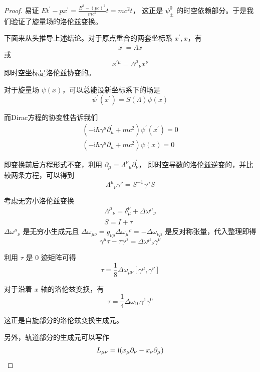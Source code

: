 \begin{proof}
易证 $E t^{\prime}-p x^{\prime}=\frac{E^{2}-(pc)^{2}}{mc^{2}} t=mc^{2} t$，
这正是 $\psi_{\pm}^{0}$ 的时空依赖部分。于是我们验证了旋量场的洛伦兹变换。

下面来从头推导上述结论。对于原点重合的两套坐标系 $x^{\prime}, x$，有
$$x^{\prime}=\Lambda x$$
或
$$x^{\prime \mu}=\Lambda^{\mu}{ }_{\nu} x^{\nu}$$
即时空坐标是洛伦兹协变的。

对于旋量场 $\psi(x)$，可以总能设新坐标系下的场是
$$\psi^{\prime}(x^{\prime})=S(\Lambda) \psi(x)$$

而Dirac方程的协变性告诉我们
$$
\begin{gathered}
\left(-\mathrm{i} \hbar \gamma^{\mu} \partial_{\mu}^{\prime}+m c^{2}\right) \psi^{\prime}(x^{\prime})=0 \\
\left(-\mathrm{i} \hbar \gamma^{\mu} \partial_{\mu}+m c^{2}\right) \psi(x)=0
\end{gathered}
$$

即变换前后方程形式不变，利用 $\partial_{\mu}=\Lambda^{\nu}{ }_{\mu} \partial_{\nu}^{\prime}$，
即时空导数的洛伦兹逆变的，并比较两条方程，可以得到
$$\Lambda^{\mu}{ }_{\nu} \gamma^{\nu}=S^{-1} \gamma^{\mu} S$$

考虑无穷小洛伦兹变换
$$
\begin{gathered}
\Lambda^{\mu}{ }_{\nu}=\delta_{\mu}^{\nu}+\Delta \omega^{\mu}{ }_{\nu} \\
S=I+\tau
\end{gathered}
$$
$\Delta \omega^{\mu}{ }_{\nu}$ 是无穷小生成元且 
$\Delta \omega_{\mu \nu}=g_{\nu \rho} \Delta \omega_{\mu}{ }^{\rho}
=-\Delta \omega_{\nu \mu}$ 是反对称张量，代入整理即得
$$\gamma^{\mu} \tau-\tau \gamma^{\mu}=\Delta \omega^{\mu}{ }_{\nu} \gamma^{\nu}$$

利用 $\tau$ 是 $0$ 迹矩阵可得
$$\tau=\frac{1}{8} \Delta \omega_{\mu \nu}\left[\gamma^{\mu}, \gamma^{\nu}\right]$$

对于沿着 $x$ 轴的洛伦兹变换，有
$$\tau=\frac{1}{4} \Delta \omega_{10} \gamma^{1} \gamma^{0}$$

这正是自旋部分的洛伦兹变换生成元。

另外，轨道部分的生成元可以写作
$$L_{\mu \nu}=\mathrm{i}(x_{\mu} \partial_{\nu}-x_{\nu} \partial_{\mu})\qedhere$$
\end{proof}

